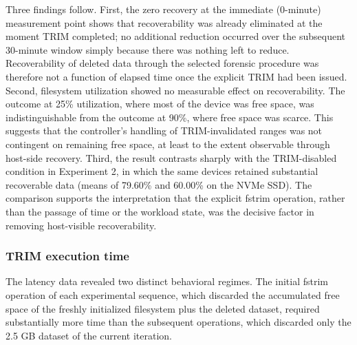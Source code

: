 Three findings follow. First, the zero recovery at the immediate (0-minute) measurement point shows that recoverability was already eliminated at the moment TRIM 
completed; no additional reduction occurred over the subsequent 30-minute window simply because there was nothing left to reduce. Recoverability of deleted data through 
the selected forensic procedure was therefore not a function of elapsed time once the explicit TRIM had been issued. Second, filesystem utilization showed no measurable 
effect on recoverability. The outcome at 25\% utilization, where most of the device was free space, was indistinguishable from the outcome at 90\%, where free space was 
scarce. This suggests that the controller's handling of TRIM-invalidated ranges was not contingent on remaining free space, at least to the extent observable through 
host-side recovery. Third, the result contrasts sharply with the TRIM-disabled condition in Experiment 2, in which the same devices retained substantial recoverable 
data (means of 79.60\% and 60.00\% on the NVMe SSD). The comparison supports the interpretation that the explicit fstrim operation, rather than the passage of time or 
the workload state, was the decisive factor in removing host-visible recoverability.

\subsubsection*{TRIM execution time}

The latency data revealed two distinct behavioral regimes. The initial fstrim operation of each experimental sequence, which discarded the accumulated free space of the 
freshly initialized filesystem plus the deleted dataset, required substantially more time than the subsequent operations, which discarded only the 2.5 GB dataset of the 
current iteration.

